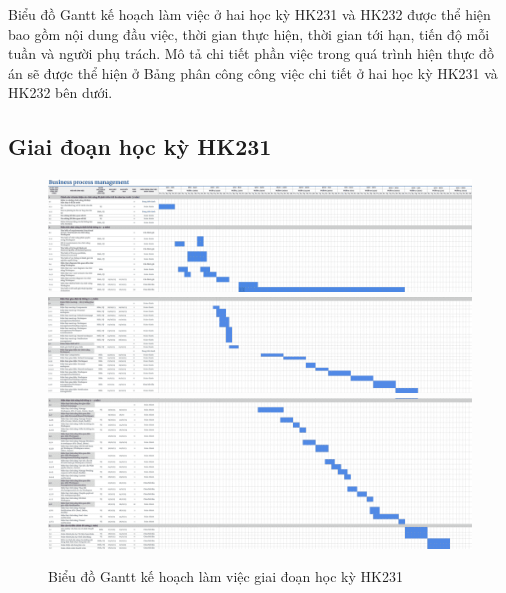 
Biểu đồ Gantt kế hoạch làm việc ở hai học kỳ HK231 và HK232 được thể hiện bao gồm nội dung đầu việc, thời gian thực hiện, thời gian tới hạn, tiến độ mỗi tuần và người phụ trách. Mô tả chi tiết phần việc trong quá trình hiện thực đồ án sẽ được thể hiện ở Bảng phân công công việc chi tiết ở hai học kỳ HK231 và HK232 bên dưới.

\subsection{Giai đoạn học kỳ HK231}

\begin{figure} [H]
    \centering
    \includegraphics[width = \linewidth]{Content/Giới thiệu đề tài/images/PCCV_HK231_1.png}
    \includegraphics[width = \linewidth]{Content/Giới thiệu đề tài/images/PCCV_HK231_2.png}
    \includegraphics[width = \linewidth]{Content/Giới thiệu đề tài/images/PCCV_HK231_3.png}
    \vspace{0.5cm}
    \caption{Biểu đồ Gantt kế hoạch làm việc giai đoạn học kỳ HK231}
    \label{fig:Biểu đồ Gantt kế hoạch làm việc giai đoạn học kỳ HK231}
\end{figure}

